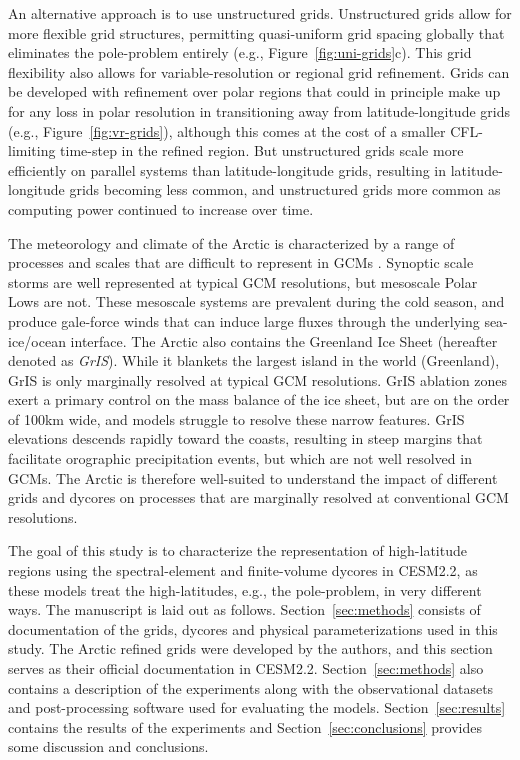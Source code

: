 \documentclass[draft]{agujournal2019}
\begin{document}
An alternative approach is to use unstructured grids. Unstructured grids allow for more flexible grid structures, permitting quasi-uniform grid spacing globally that eliminates the pole-problem entirely (e.g., Figure~\ref{fig:uni-grids}c). This grid flexibility also allows for variable-resolution or regional grid refinement. Grids can be developed with refinement over polar regions that could in principle make up for any loss in polar resolution in transitioning away from latitude-longitude grids (e.g., Figure~\ref{fig:vr-grids}), although this comes at the cost of a smaller CFL-limiting time-step in the refined region. But unstructured grids scale more efficiently on parallel systems than latitude-longitude grids, resulting in latitude-longitude grids becoming less common, and unstructured grids more common as computing power continued to increase over time.

The meteorology and climate of the Arctic is characterized by a range of processes and scales that are difficult to represent in GCMs \cite{BETAL2001MWR,SG2017MWR,VETAL2018TC}. Synoptic scale storms are well represented at typical GCM resolutions, but mesoscale Polar Lows are not. These mesoscale systems are prevalent during the cold season, and produce gale-force winds that can induce large fluxes through the underlying sea-ice/ocean interface. The Arctic also contains the Greenland Ice Sheet (hereafter denoted as \textit{GrIS}). While it blankets the largest island in the world (Greenland), GrIS is only marginally resolved at typical GCM resolutions. GrIS ablation zones exert a primary control on the mass balance of the ice sheet, but are on the order of 100km wide, and models struggle to resolve these narrow features. GrIS elevations descends rapidly toward the coasts, resulting in steep margins that facilitate orographic precipitation events, but which are not well resolved in GCMs. The Arctic is therefore well-suited to understand the impact of different grids and dycores on processes that are marginally resolved at conventional GCM resolutions.

The goal of this study is to characterize the representation of high-latitude regions using the spectral-element and finite-volume dycores in CESM2.2, as these models treat the high-latitudes, e.g., the pole-problem, in very different ways. The manuscript is laid out as follows. Section~\ref{sec:methods} consists of documentation of the grids, dycores and physical parameterizations used in this study. The Arctic refined grids were developed by the authors, and this section serves as their official documentation in CESM2.2. Section~\ref{sec:methods} also contains a description of the experiments along with the observational datasets and post-processing software used for evaluating the models. Section~\ref{sec:results} contains the results of the experiments and Section~\ref{sec:conclusions} provides some discussion and conclusions. 
\end{document}
